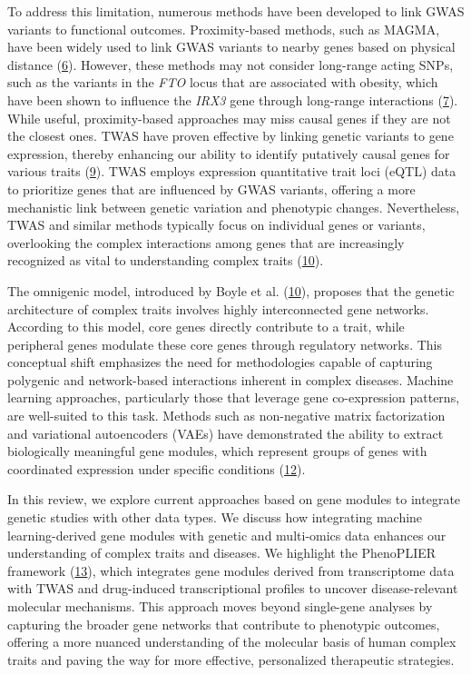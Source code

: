 To address this limitation, numerous methods have been developed to link GWAS variants to functional outcomes.
Proximity-based methods, such as MAGMA, have been widely used to link GWAS variants to nearby genes based on physical distance (\protect\hyperlink{ref-19XiXgYmd}{6}).
However, these methods may not consider long-range acting SNPs, such as the variants in the \emph{FTO} locus that are associated with obesity, which have been shown to influence the \emph{IRX3} gene through long-range interactions (\protect\hyperlink{ref-167QL5tMV}{7}).
While useful, proximity-based approaches may miss causal genes if they are not the closest ones.
TWAS have proven effective by linking genetic variants to gene expression, thereby enhancing our ability to identify putatively causal genes for various traits (\protect\hyperlink{ref-l6ogswV3}{9}).
TWAS employs expression quantitative trait loci (eQTL) data to prioritize genes that are influenced by GWAS variants, offering a more mechanistic link between genetic variation and phenotypic changes.
Nevertheless, TWAS and similar methods typically focus on individual genes or variants, overlooking the complex interactions among genes that are increasingly recognized as vital to understanding complex traits (\protect\hyperlink{ref-vpIDZCSa}{10}).

The omnigenic model, introduced by Boyle et al. (\protect\hyperlink{ref-vpIDZCSa}{10}), proposes that the genetic architecture of complex traits involves highly interconnected gene networks.
According to this model, core genes directly contribute to a trait, while peripheral genes modulate these core genes through regulatory networks.
This conceptual shift emphasizes the need for methodologies capable of capturing polygenic and network-based interactions inherent in complex diseases.
Machine learning approaches, particularly those that leverage gene co-expression patterns, are well-suited to this task.
Methods such as non-negative matrix factorization and variational autoencoders (VAEs) have demonstrated the ability to extract biologically meaningful gene modules, which represent groups of genes with coordinated expression under specific conditions (\protect\hyperlink{ref-170T6ip47}{12}).

In this review, we explore current approaches based on gene modules to integrate genetic studies with other data types.
We discuss how integrating machine learning-derived gene modules with genetic and multi-omics data enhances our understanding of complex traits and diseases.
We highlight the PhenoPLIER framework (\protect\hyperlink{ref-NM3rHx1i}{13}), which integrates gene modules derived from transcriptome data with TWAS and drug-induced transcriptional profiles to uncover disease-relevant molecular mechanisms.
This approach moves beyond single-gene analyses by capturing the broader gene networks that contribute to phenotypic outcomes, offering a more nuanced understanding of the molecular basis of human complex traits and paving the way for more effective, personalized therapeutic strategies.

